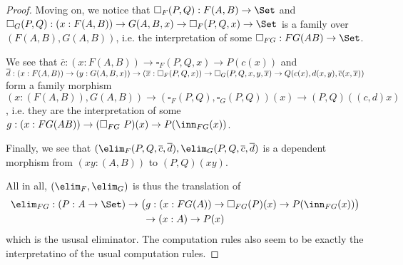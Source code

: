 \documentclass{article}
\begin{document}
\begin{proof}
Moving on, we notice that $\square_F(P, Q) : F(A, B) \to \Set$ and
$\square_G(P, Q) : \\ (x : F(A, B)) \to G(A, B, x) \to \square_F(P, Q,
x) \to \Set$ is a family over $(F(A,B), G(A,B))$, i.e. the
interpretation of some $\square_{FG} : FG(AB) \to \Set$.

We see that $\overline{c} : (x : F(A, B)) \to
\square_F(P, Q, x) \to P(c(x))$ and $\overline{d} : (x : F(A, B)) \\ \to
(y : G(A, B, x)) \to (\overline{x} : \square_F(P, Q, x)) \to
\square_G(P, Q, x, y, \overline{x}) \to Q(c(x), d(x, y),
\overline{c}(x, \overline{x}))$ form a family morphism $(x : (F(A, B)), G(A, B)) \to (\square_F(P, Q), \square_G(P, Q))(x) \to
(P, Q)((c, d)x)$, i.e. they are the interpretation of
some $g : (x : FG(AB)) \to (\square_{FG}\ P)(x) \to P(\inn_{FG}(x))$.


Finally, we see that $(\elim_F(P, Q,
\overline{c}, \overline{d}), \elim_G(P, Q, \overline{c},
\overline{d})$ is a dependent morphism from $(xy : (A, B))$ to $(P,
Q)(xy)$.

All in all, $(\elim_F, \elim_G)$ is thus the translation of 
\begin{multline*}
\elim_{FG} : (P : A \to \Set) \to \big(g : (x : FG(A)) \to \square_{FG}(P)(x) \to P(\inn_{FG}(x))\big) \\ \to (x : A) \to P(x)
\end{multline*}
which is the ususal eliminator. The computation rules also seem to be
exactly the interpretatino of the usual computation rules.
\end{proof}
\end{document}
